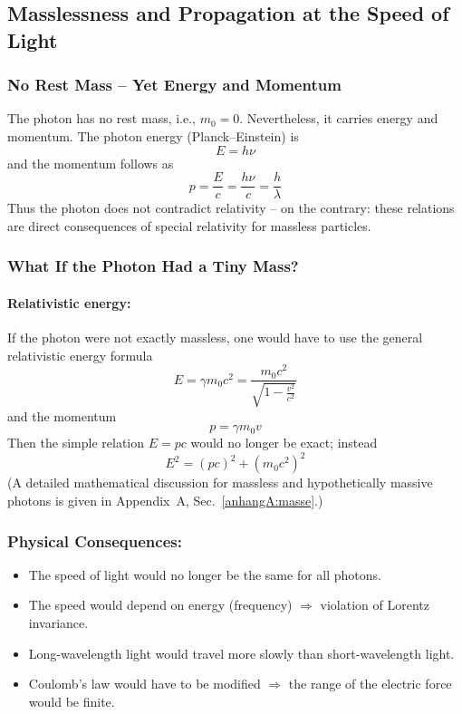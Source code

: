 \subsection{Masslessness and Propagation at the Speed of Light}

\subsubsection{No Rest Mass – Yet Energy and Momentum}

The photon has no rest mass, i.e., $m_0 = 0$. Nevertheless, it carries energy and momentum. The photon energy (Planck–Einstein) is
$$
E = h \nu
$$
and the momentum follows as
$$
p = \frac{E}{c} = \frac{h\nu}{c} = \frac{h}{\lambda}
$$
Thus the photon does not contradict relativity – on the contrary: these relations are direct consequences of special relativity for massless particles.

\subsubsection{What If the Photon Had a Tiny Mass?}

\paragraph{Relativistic energy:} If the photon were not exactly massless, one would have to use the general relativistic energy formula
$$
E = \gamma m_0 c^2 = \frac{m_0 c^2}{\sqrt{1 - \frac{v^2}{c^2}}}
$$
and the momentum
$$
p = \gamma m_0 v
$$
Then the simple relation $E = pc$ would no longer be exact; instead
$$
E^2 = (pc)^2 + (m_0 c^2)^2
$$
(A detailed mathematical discussion for massless and hypothetically massive photons is given in Appendix~A, Sec.~\ref{anhangA:masse}.)
\newpage
\noindent
\subsubsection*{Physical Consequences:}
\begin{itemize}
	\item The speed of light would no longer be the same for all photons.
	\item The speed would depend on energy (frequency) $\Rightarrow$ violation of Lorentz invariance.
	\item Long-wavelength light would travel more slowly than short-wavelength light.
	\item Coulomb's law would have to be modified $\Rightarrow$ the range of the electric force would be finite.
\end{itemize}

